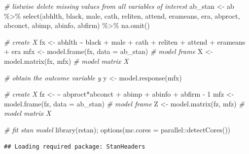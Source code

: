 \documentclass[
]{book}
\newenvironment{Shaded}{\begin{snugshade}}{\end{snugshade}}
\newcommand{\AttributeTok}[1]{\textcolor[rgb]{0.77,0.63,0.00}{#1}}
\newcommand{\CommentTok}[1]{\textcolor[rgb]{0.56,0.35,0.01}{\textit{#1}}}
\newcommand{\DecValTok}[1]{\textcolor[rgb]{0.00,0.00,0.81}{#1}}
\newcommand{\ErrorTok}[1]{\textcolor[rgb]{0.64,0.00,0.00}{\textbf{#1}}}
\newcommand{\FunctionTok}[1]{\textcolor[rgb]{0.00,0.00,0.00}{#1}}
\newcommand{\NormalTok}[1]{#1}
\newcommand{\OtherTok}[1]{\textcolor[rgb]{0.56,0.35,0.01}{#1}}
\newcommand{\SpecialCharTok}[1]{\textcolor[rgb]{0.00,0.00,0.00}{#1}}
\begin{document}
\begin{Shaded}
\begin{Highlighting}[]
\CommentTok{\# listwise delete missing values from all variables of interest}
\NormalTok{ab\_stan }\OtherTok{\textless{}{-}}\NormalTok{ ab }\SpecialCharTok{\%\textgreater{}\%}
  \FunctionTok{select}\NormalTok{(abhlth, black, male, cath, reliten, attend, erameans, era, }
\NormalTok{         abproct, abconct, abimp, abinfo, abfirm) }\SpecialCharTok{\%\textgreater{}\%}
  \FunctionTok{na.omit}\NormalTok{()}

\CommentTok{\# create X}
\NormalTok{fx }\OtherTok{\textless{}{-}}\NormalTok{ abhlth }\SpecialCharTok{\textasciitilde{}}\NormalTok{ black }\SpecialCharTok{+}\NormalTok{ male }\SpecialCharTok{+}\NormalTok{ cath }\SpecialCharTok{+}\NormalTok{ reliten }\SpecialCharTok{+}\NormalTok{ attend }\SpecialCharTok{+}\NormalTok{ erameans }\SpecialCharTok{+}\NormalTok{ era}
\NormalTok{mfx }\OtherTok{\textless{}{-}} \FunctionTok{model.frame}\NormalTok{(fx, }\AttributeTok{data =}\NormalTok{ ab\_stan)  }\CommentTok{\# model frame}
\NormalTok{X }\OtherTok{\textless{}{-}} \FunctionTok{model.matrix}\NormalTok{(fx, mfx)         }\CommentTok{\# model matrix X}

\CommentTok{\# obtain the outcome variable y}
\NormalTok{y }\OtherTok{\textless{}{-}} \FunctionTok{model.response}\NormalTok{(mfx)}

\CommentTok{\# create X}
\NormalTok{fz }\OtherTok{\textless{}{-}} \ErrorTok{\textasciitilde{}}\NormalTok{ abproct}\SpecialCharTok{*}\NormalTok{abconct }\SpecialCharTok{+}\NormalTok{ abimp }\SpecialCharTok{+}\NormalTok{ abinfo }\SpecialCharTok{+}\NormalTok{ abfirm }\SpecialCharTok{{-}} \DecValTok{1}
\NormalTok{mfz }\OtherTok{\textless{}{-}} \FunctionTok{model.frame}\NormalTok{(fz, }\AttributeTok{data =}\NormalTok{ ab\_stan)  }\CommentTok{\# model frame}
\NormalTok{Z }\OtherTok{\textless{}{-}} \FunctionTok{model.matrix}\NormalTok{(fz, mfz)         }\CommentTok{\# model matrix X}

\CommentTok{\# fit stan model}
\FunctionTok{library}\NormalTok{(rstan); }\FunctionTok{options}\NormalTok{(}\AttributeTok{mc.cores =}\NormalTok{ parallel}\SpecialCharTok{::}\FunctionTok{detectCores}\NormalTok{())}
\end{Highlighting}
\end{Shaded}

\begin{verbatim}
## Loading required package: StanHeaders
\end{verbatim}
\end{document}
